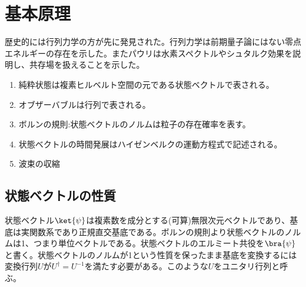 
\section{基本原理}
	歴史的には行列力学の方が先に発見された。行列力学は前期量子論にはない零点エネルギーの存在を示した。またパウリは水素スペクトルやシュタルク効果を説明し、共存場を扱えることを示した。
	\begin{enumerate}
		\item 純粋状態は複素ヒルベルト空間の元である状態ベクトルで表される。
		\item オブザーバブルは行列で表される。
		\item ボルンの規則:状態ベクトルのノルムは粒子の存在確率を表す。
		\item 状態ベクトルの時間発展はハイゼンベルクの運動方程式で記述される。
		\item 波束の収縮
	\end{enumerate}
	\subsection{状態ベクトルの性質}
		状態ベクトル$\ket{\psi}$は複素数を成分とする(可算)無限次元ベクトルであり、基底は実関数系であり正規直交基底である。ボルンの規則より状態ベクトルのノルムは1、つまり単位ベクトルである。状態ベクトルのエルミート共役を$\bra{\psi}$と書く。状態ベクトルのノルムが1という性質を保ったまま基底を変換するには変換行列$U$が$U^\dag = U^{-1}$を満たす必要がある。このような$U$をユニタリ行列と呼ぶ。